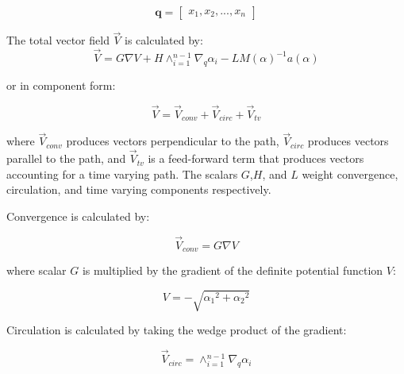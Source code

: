 \documentclass[numbered,pdftex]{ohio-etd}
\begin{document}


\begin{equation}
\mathbf{q} = \begin{bmatrix} x_1, x_2, ..., x_{n}\end{bmatrix}
\end{equation}

\noindent
The total vector field $\overrightarrow{V}$ is calculated by:
\begin{equation}\label{eq:GVF}
\overrightarrow{V} = G \nabla V + H \wedge_{i=1}^{n-1}\nabla_q\alpha_i  - LM(\alpha)^{-1} a(\alpha)
\end{equation}

\noindent
or in component form:

\begin{equation}\label{simpleGVF}
\overrightarrow{V} = \overrightarrow{V}_{conv} + \overrightarrow{V}_{circ} + \overrightarrow{V}_{tv} 
\end{equation}	

\noindent
where $\overrightarrow{V}_{conv}$ produces vectors perpendicular to the path, $\overrightarrow{V}_{circ}$ produces vectors parallel to the path, and $\overrightarrow{V}_{tv}$ is a feed-forward term that produces vectors accounting for a time varying path. The scalars $G$,$H$, and $L$ weight convergence, circulation, and time varying components respectively. 

\noindent
Convergence is calculated by:

\begin{equation}
\overrightarrow{V}_{conv} = G \nabla V  
\label{convOnly}
\end{equation}

\noindent
where scalar $G$ is multiplied by the gradient of the definite potential function $V$:

\begin{equation}
V = -\sqrt{{\alpha_1}^2 + {\alpha_2}^2}
\end{equation}


\noindent
Circulation is calculated by taking the wedge product of the gradient:

\begin{equation}
\overrightarrow{V}_{circ} =  \wedge_{i=1}^{n-1}\nabla_q\alpha_i 
\label{circOnly}
\end{equation}
\end{document}
